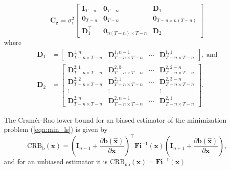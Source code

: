 \begin{equation} \mathbf{C}_{\mathbf{z}} = \sigma_{\epsilon}^2 \begin{bmatrix} \mathbf{I}_{T-n} & \mathbf{0}_{T-n} & \mathbf{D}_1 \\ \mathbf{0}_{T-n} & \mathbf{0}_{T-n} & \mathbf{0}_{T-n \times n \left( T-n \right)}  \\  \mathbf{D}_1^\top & \mathbf{0}_{n \left( T-n \right) \times T-n} & \mathbf{D}_2  \end{bmatrix}  \label{eqn:Cz} \end{equation} 
where
\begin{equation*} \begin{aligned} \mathbf{D}_1 &= \begin{bmatrix}\mathbf{D}_{T-n \times T-n}^{1,n} & \mathbf{D}_{T-n \times T-n}^{1,n-1} & \cdots  & \mathbf{D}_{T-n \times T-n}^{1,1}\end{bmatrix}, \ \mathrm{
and} \\ 
 \mathbf{D}_2 &= \begin{bmatrix} \mathbf{D}_{T-n \times T-n}^{2,1} & \mathbf{D}_{T-n \times T-n}^{2,0} & \cdots & \mathbf{D}_{T-n \times T-n}^{2,2-n} \\ \mathbf{D}_{T-n \times T-n}^{2,2} & \mathbf{D}_{T-n \times T-n}^{2,1} & \cdots & \mathbf{D}_{T-n \times T-n}^{2,3-n} \\ \vdots & \vdots & & \vdots \\ \mathbf{D}_{T-n \times T-n}^{2,n} & \mathbf{D}_{T-n \times T-n}^{2,n-1} & \cdots & \mathbf{D}_{T-n \times T-n}^{2,1} \end{bmatrix} . \end{aligned}  \end{equation*} 



The Cram\'er-Rao lower bound for an biased estimator of the minimization problem (\ref{eqn:min_ls}) is given by
\begin{equation} \mathrm{CRB}_{\mathrm{b}}(\mathbf{x}) = \left( \mathbf{I}_{n+1} + \frac{\partial \mathbf{b} \left( \widehat{\mathbf{x}} \right) }{\partial \mathbf{x} } \right)^\top \mathbf{Fi}^{-1}(\mathbf{x}) \left( \mathbf{I}_{n+1} + \frac{\partial \mathbf{b} \left( \widehat{\mathbf{x}} \right) }{\partial \mathbf{x} } \right), \label{eqn:CRB_EIV} \end{equation} 
and for an unbiased estimator it is $\mathrm{CRB}_{\mathrm{ub}}(\mathbf{x}) = \mathbf{Fi}^{-1}(\mathbf{x})$



\newpage

